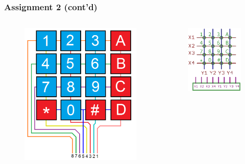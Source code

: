 \begin{frame}
  \frametitle{Assignment 2 (cont'd)}
  \begin{columns}
      \begin{figure}
        \centering
        \includegraphics[scale=0.2]{images/keypad-pinout1.png}
      \end{figure}
      \begin{figure}
        \centering
        \includegraphics[scale=0.4]{images/keypad-pinout2.png}
      \end{figure}
  \end{columns}
\end{frame}

